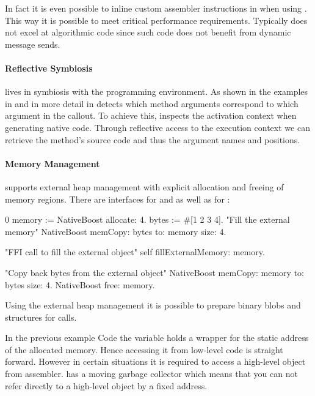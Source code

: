 In fact it is even possible to inline custom assembler instructions in \PH when using \NB.
This way it is possible to meet critical performance requirements.
Typically \ST does not excel at algorithmic code since such code does not benefit from dynamic message sends.

\paragraph{Reflective Symbiosis}

\NB lives in symbiosis with the \PH programming environment.
As shown in the examples in  and in more detail in  \NB detects which method arguments correspond to which argument in the \FFI callout.
To achieve this, \NB inspects the activation context when generating native code.
Through reflective access to the execution context we can retrieve the method's source code and thus the argument names and positions.

\paragraph{Memory Management}


\NB supports external heap management with explicit allocation and freeing of memory regions.
There are interfaces for  and  as well as for :
%
\begin{stcode}[
	label={lst:externalHeap},
	caption={Example of external heap management in \NB}]{0}
memory := NativeBoost allocate: 4.
bytes  := #[1 2 3 4].
"Fill the external memory"
NativeBoost memCopy: bytes to: memory size: 4.

"FFI call to fill the external object"
self fillExternalMemory: memory.

"Copy back bytes from the external object"
NativeBoost memCopy: memory to: bytes size: 4.
NativeBoost free: memory.
\end{stcode}

Using the external heap management it is possible to prepare binary blobs and structures for \FFI calls.

In the previous example Code  the  variable holds a wrapper for the static address of the allocated memory.
Hence accessing it from low-level code is straight forward.
However in certain situations it is required to access a high-level object from assembler.
\PH has a moving garbage collector which means that you can not refer directly to a high-level object by a fixed address.

